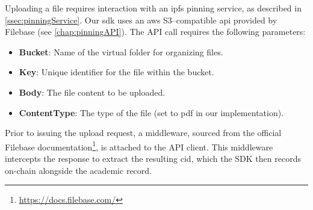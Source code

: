 Uploading a file requires interaction with an \acrshort{ipfs} pinning service, as described in \cref{ssec:pinningService}. Our \acrshort{sdk} uses an \acrshort{aws} S3–compatible \acrshort{api} provided by Filebase (see \cref{chap:pinningAPI}). The API call requires the following parameters:
\begin{itemize}
    \item \textbf{Bucket}: Name of the virtual folder for organizing files.
    \item \textbf{Key}: Unique identifier for the file within the bucket.
    \item \textbf{Body}: The file content to be uploaded.
    \item \textbf{ContentType}: The type of the file (set to \acrshort{pdf} in our implementation).
\end{itemize}
Prior to issuing the upload request, a middleware, sourced from the official Filebase documentation\footnote{\url{https://docs.filebase.com/}}, is attached to the API client. This middleware intercepts the response to extract the resulting \acrshort{cid}, which the SDK then records on-chain alongside the academic record.
